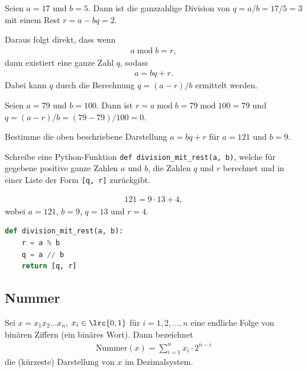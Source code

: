 \begin{myexample}
Seien $a = 17$ und $b = 5$. Dann ist die ganzzahlige Division von $ q = a / b = 17 / 5 = 3$ mit einem Rest $r = a - bq=2$.
\end{myexample}
Daraus folgt direkt, dass wenn
\begin{align}
	a\; \text{mod}\; b = r,
\end{align}
dann existiert eine ganze Zahl $q$, sodass
\begin{align}
	a = bq + r.
\end{align}
Dabei kann $q$ durch die Berechnung $q = (a - r) / b$ ermittelt werden.

\begin{myexample}
Seien $a = 79$ und $b = 100$. Dann ist  $r = a\; \text{mod}\; b = 79\; \text{mod}\; 100 = 79$ und $q = (a-r) / b = (79 - 79) / 100 = 0$.
\end{myexample}

\begin{myexercise}
	\begin{aenum}
		\item Bestimme die oben beschriebene Darstellung $a = bq + r$ für $a = 121$ und $b = 9$.
		\item Schreibe eine Python-Funktion \lstinline|def division_mit_rest(a, b)|, welche für gegebene positive ganze Zahlen $a$ und $b$, die Zahlen $q$ und $r$ berechnet und in einer Liste der Form \lstinline|[q, r]| zurückgibt.
	\end{aenum}
	\begin{myanswer}
		\begin{aenum}
			\item \begin{align*}
				121 = 9\cdot 13 + 4,
			\end{align*}
			wobei $a = 121$, $b = 9$, $q = 13$ und $r = 4$.
			\item \leavevmode
			\begin{lstlisting}[language=Python,caption=Division mit Rest,numbers=none]
def division_mit_rest(a, b):
    r = a % b
    q = a // b
    return [q, r]
\end{lstlisting}
		\end{aenum}
	\end{myanswer}
\end{myexercise}

\subsection{Nummer}
Sei $x=x_1x_2\ldots x_n$, $x_i\in\lrc{0,1}$ für $i = 1,2,\ldots, n$ eine endliche Folge von binären Ziffern (ein binäres Wort). Dann bezeichnet
\begin{align}
	\text{Nummer}(x)=\displaystyle\sum_{i=1}^n x_i\cdot 2^{n-i}
\end{align}
die (kürzeste) Darstellung von $x$ im Dezimalsystem.

